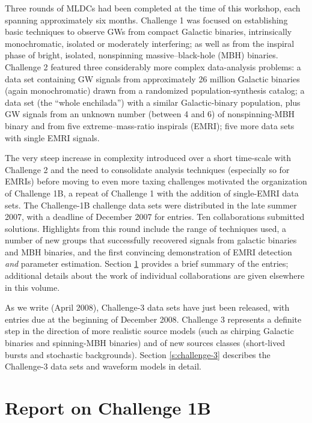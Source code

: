 \documentclass{iopart}
\begin{document}
Three rounds of MLDCs had been completed at the time of this workshop, each spanning approximately six months. Challenge 1 \cite{mldclisasymp,mldcgwdaw1} was focused on establishing basic techniques to observe GWs from compact Galactic binaries, intrinsically monochromatic, isolated or moderately interfering; as well as from the inspiral phase of bright, isolated, nonspinning massive--black-hole (MBH) binaries. Challenge 2 \cite{mldcgwdaw2,mldcamaldi2} featured three considerably more complex data-analysis problems: a data set containing GW signals from approximately 26 million Galactic binaries (again monochromatic) drawn from a randomized population-synthesis catalog; a data set (the ``whole enchilada'') with a similar Galactic-binary population, plus GW signals from an unknown number (between 4 and 6) of nonspinning-MBH binary and from five extreme--mass-ratio inspirals (EMRI); five more data sets with single EMRI signals.

The very steep increase in complexity introduced over a short time-scale with Challenge 2 and the need to consolidate analysis techniques  (especially so for EMRIs) before moving to even more taxing challenges motivated the organization of Challenge 1B, a repeat of Challenge 1 with the addition of single-EMRI data sets. The Challenge-1B challenge data sets were distributed in the late summer 2007, with a deadline of December 2007 for entries. Ten collaborations submitted solutions. Highlights from this round include the range of techniques used, a number of new groups that successfully recovered signals from galactic binaries and MBH binaries, and the first convincing demonstration of EMRI detection \emph{and} parameter estimation. Section \ref{s:challenge-1b} provides a brief summary of the entries; additional details about the work of individual collaborations are given elsewhere in this volume.

As we write (April 2008), Challenge-3 data sets have just been released, with entries due at the beginning of December 2008. Challenge 3 represents a definite step in the direction of more realistic source models (such as chirping Galactic binaries and spinning-MBH binaries) and of new sources classes (short-lived bursts and stochastic backgrounds). Section \ref{s:challenge-3} describes the Challenge-3 data sets and waveform models in detail.

\section{Report on Challenge 1B}
\label{s:challenge-1b}
\end{document}

